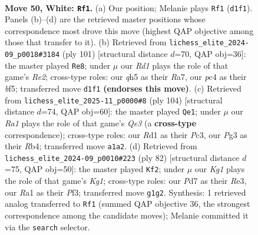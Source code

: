 \documentclass[11pt]{article}
\begin{document}
\clearpage

\begin{figure}[p]\centering
\begin{subfigure}{0.46\textwidth}\centering
\resizebox{\linewidth}{!}{%
\newchessgame
\chessboard[
  setfen={3r2k1/p2P4/1p6/2n1Qp1q/P1p5/6P1/1P6/R2R2K1 w - - 1 50},
  showmover=false,
  pgfstyle=straightmove, color=movearrow, markmove={d1-f1}
]}
\caption{}
\end{subfigure}\hfill
\begin{subfigure}{0.46\textwidth}\centering
\resizebox{\linewidth}{!}{%
\newchessgame
\chessboard[
  setfen={3Q1k2/r3rp2/1p6/2p2BR1/2P2P1q/p3P3/7P/R6K b - - 2 51},
  showmover=false,
  pgfstyle=straightmove, color=movearrow, markmove={e7-e8}
]}
\caption{}
\end{subfigure}
\\[4pt]
\begin{subfigure}{0.46\textwidth}\centering
\resizebox{\linewidth}{!}{%
\newchessgame
\chessboard[
  setfen={5r2/1r5k/1P1R4/3P2pp/1R3P2/p1P1Q3/2q5/K7 w - - 1 53},
  showmover=false,
  pgfstyle=straightmove, color=movearrow, markmove={e3-e1}
]}
\caption{}
\end{subfigure}\hfill
\begin{subfigure}{0.46\textwidth}\centering
\resizebox{\linewidth}{!}{%
\newchessgame
\chessboard[
  setfen={4r2k/5qp1/3p3p/p6P/3Q2P1/4RP2/1P6/6K1 w - - 1 42},
  showmover=false,
  pgfstyle=straightmove, color=movearrow, markmove={g1-f2}
]}
\caption{}
\end{subfigure}
\caption{\textbf{Move 50, White: \texttt{Rf1}.} (a) Our position; Melanie plays \texttt{Rf1} (\texttt{d1f1}). Panels (b)--(d) are the retrieved master positions whose correspondence most drove this move (highest QAP objective among those that transfer to it). (b) Retrieved from \texttt{lichess\_elite\_2024-09\_p0018\#3184} (ply 101) [structural distance $d$=70, QAP obj=36]: the master played \texttt{Re8}; under $\mu$ our \emph{Rd1} plays the role of that game's \emph{Re2}; cross-type roles: our \emph{q}h5 as their \emph{R}a7, our \emph{p}c4 as their \emph{b}f5; transferred move \texttt{d1f1} \textbf{(endorses this move)}. (c) Retrieved from \texttt{lichess\_elite\_2025-11\_p0000\#8} (ply 104) [structural distance $d$=74, QAP obj=60]: the master played \texttt{Qe1}; under $\mu$ our \emph{Ra1} plays the role of that game's \emph{Qe3} (a \textbf{cross-type} correspondence); cross-type roles: our \emph{R}d1 as their \emph{P}c3, our \emph{P}g3 as their \emph{R}b4; transferred move \texttt{a1a2}. (d) Retrieved from \texttt{lichess\_elite\_2024-09\_p0010\#223} (ply 82) [structural distance $d$=75, QAP obj=50]: the master played \texttt{Kf2}; under $\mu$ our \emph{Kg1} plays the role of that game's \emph{Kg1}; cross-type roles: our \emph{P}d7 as their \emph{R}e3, our \emph{R}a1 as their \emph{P}f3; transferred move \texttt{g1g2}. Synthesis: 1 retrieved analog transferred to \texttt{Rf1} (summed QAP objective 36, the strongest correspondence among the candidate moves); Melanie committed it via the \texttt{search} selector.}
\label{fig:thought-m98}
\end{figure}
\end{document}
